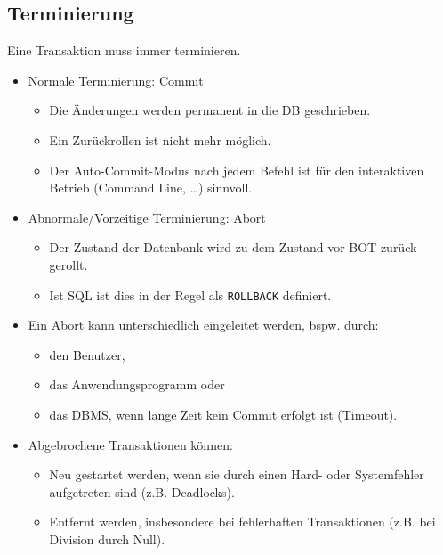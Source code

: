 \documentclass[a4paper, 11pt, accentcolor = tud3b]{tudreport}
\begin{document}
            \subsection{Terminierung} %
            	Eine Transaktion muss immer terminieren.
                \begin{itemize}
                	\item Normale Terminierung: Commit
                		\begin{itemize}
                			\item Die Änderungen werden permanent in die DB geschrieben.
                			\item Ein Zurückrollen ist nicht mehr möglich.
                			\item Der Auto-Commit-Modus nach jedem Befehl ist für den interaktiven Betrieb (Command Line, \dots) sinnvoll.
                		\end{itemize}
                	\item Abnormale/Vorzeitige Terminierung: Abort
                		\begin{itemize}
                			\item Der Zustand der Datenbank wird zu dem Zustand vor BOT zurück gerollt.
                			\item Ist SQL ist dies in der Regel als \lstinline|ROLLBACK| definiert.
                		\end{itemize}
                	\item Ein Abort kann unterschiedlich eingeleitet werden, bspw. durch:
                		\begin{itemize}
                			\item den Benutzer,
                			\item das Anwendungsprogramm oder
                			\item das DBMS, wenn lange Zeit kein Commit erfolgt ist (Timeout).
                		\end{itemize}
                	\item Abgebrochene Transaktionen können:
                		\begin{itemize}
                			\item Neu gestartet werden, wenn sie durch einen Hard- oder Systemfehler aufgetreten sind (z.B. Deadlocks).
                			\item Entfernt werden, insbesondere bei fehlerhaften Transaktionen (z.B. bei Division durch Null).
                		\end{itemize}
                \end{itemize}
\end{document}
